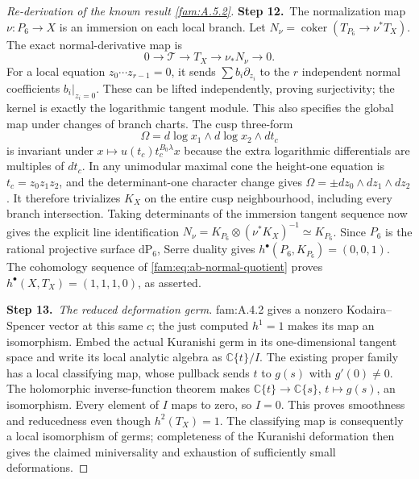 \documentclass[11pt,a4paper]{article}
\theoremstyle{plain}
\theoremstyle{definition}
\begin{document}
\begin{proof}[Re-derivation of the known result \ref{fam:A.5.2}]
\par\smallskip\noindent\textbf{Step 12.}\ The normalization map $\nu:P_6\to X$ is an immersion on each local
branch. Let $N_\nu=\operatorname{coker}(T_{P_6}\to\nu^*T_X)$.
The exact normal-derivative map is
\begin{equation}\label{fam:eq:ab-normal-quotient}
 0\longrightarrow\mathcal T\longrightarrow T_X
 \longrightarrow\nu_*N_\nu\longrightarrow0.
\end{equation}
For a local equation $z_0\cdots z_{r-1}=0$, it sends
$\sum b_i\partial_{z_i}$ to the $r$ independent normal coefficients
$b_i|_{z_i=0}$. These can be lifted independently, proving
surjectivity; the kernel is exactly the logarithmic tangent module.
This also specifies the global map under changes of branch charts.
The cusp three-form
\[
 \Omega=d\log x_1\wedge d\log x_2\wedge dt_c
\]
is invariant under $x\mapsto u(t_c)t_c^{B_0\lambda}x$ because the
extra logarithmic differentials are multiples of $dt_c$. In any
unimodular maximal cone the height-one equation is $t_c=z_0z_1z_2$,
and the determinant-one character change gives
$\Omega=\pm dz_0\wedge dz_1\wedge dz_2$.
It therefore trivializes $K_X$ on the entire cusp neighbourhood,
including every branch intersection. Taking determinants of the
immersion tangent sequence now gives the explicit line identification
$N_\nu=K_{P_6}\otimes(\nu^*K_X)^{-1}\simeq K_{P_6}$.
Since $P_6$ is the rational projective surface $\mathrm{dP}_6$,
Serre duality gives $h^\bullet(P_6,K_{P_6})=(0,0,1)$.
The cohomology sequence of \eqref{fam:eq:ab-normal-quotient} proves
$h^\bullet(X,T_X)=(1,1,1,0)$, as asserted.

\par\smallskip\noindent\textbf{Step 13.}\ \emph{The reduced deformation germ.}
fam:A.4.2 gives a nonzero Kodaira--Spencer vector at this same $c$;
the just computed $h^1=1$ makes its map an isomorphism.
Embed the actual Kuranishi germ in its one-dimensional tangent space
and write its local analytic algebra as $\mathbb C\{t\}/I$.
The existing proper family has a local classifying map, whose pullback
sends $t$ to $g(s)$ with $g'(0)\ne0$. The holomorphic inverse-function
theorem makes $\mathbb C\{t\}\to\mathbb C\{s\}$, $t\mapsto g(s)$,
an isomorphism. Every element of $I$ maps to zero, so $I=0$.
This proves smoothness and reducedness even though $h^2(T_X)=1$.
The classifying map is consequently a local isomorphism of germs;
completeness of the Kuranishi deformation then gives the claimed
miniversality and exhaustion of sufficiently small deformations.
\end{proof}
\end{document}
